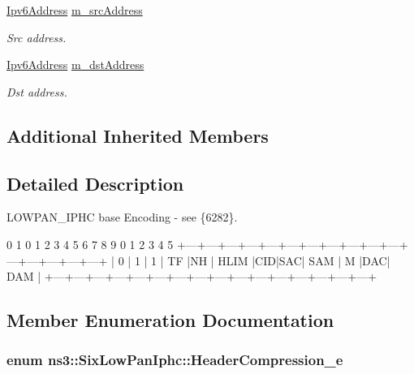 \begin{DoxyCompactItemize}
\hyperlink{classns3_1_1Ipv6Address}{Ipv6\+Address} \hyperlink{classns3_1_1SixLowPanIphc_a12eecec35a5a9a549fd7fc785b65df59}{m\+\_\+src\+Address}
\begin{DoxyCompactList}\small\item\em Src address. \end{DoxyCompactList}\item 
\hyperlink{classns3_1_1Ipv6Address}{Ipv6\+Address} \hyperlink{classns3_1_1SixLowPanIphc_a2c3fb6612dcc27d415ba1d9f0c17c767}{m\+\_\+dst\+Address}
\begin{DoxyCompactList}\small\item\em Dst address. \end{DoxyCompactList}\end{DoxyCompactItemize}
\subsection*{Additional Inherited Members}


\subsection{Detailed Description}
L\+O\+W\+P\+A\+N\+\_\+\+I\+P\+HC base Encoding -\/ see \{6282\}. 

\begin{DoxyVerb}     0                                       1
     0   1   2   3   4   5   6   7   8   9   0   1   2   3   4   5
   +---+---+---+---+---+---+---+---+---+---+---+---+---+---+---+---+
   | 0 | 1 | 1 |  TF   |NH | HLIM  |CID|SAC|  SAM  | M |DAC|  DAM  |
   +---+---+---+---+---+---+---+---+---+---+---+---+---+---+---+---+
\end{DoxyVerb}
 

\subsection{Member Enumeration Documentation}
\subsubsection[{\texorpdfstring{Header\+Compression\+\_\+e}{HeaderCompression_e}}]{\setlength{\rightskip}{0pt plus 5cm}enum {\bf ns3\+::\+Six\+Low\+Pan\+Iphc\+::\+Header\+Compression\+\_\+e}}\hypertarget{classns3_1_1SixLowPanIphc_a384e6b68c86e9d9a07c923dbc21a6843}{}\label{classns3_1_1SixLowPanIphc_a384e6b68c86e9d9a07c923dbc21a6843}



